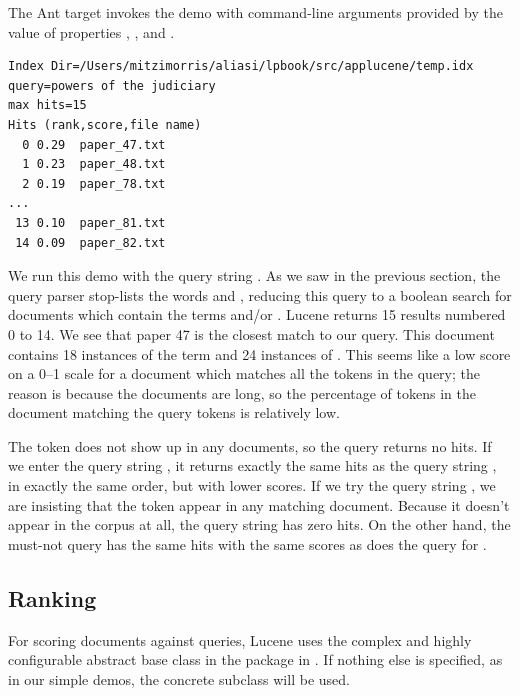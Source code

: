 The Ant target  invokes the demo with command-line
arguments provided by the value of properties ,
, and .
%
\begin{verbatim}
Index Dir=/Users/mitzimorris/aliasi/lpbook/src/applucene/temp.idx
query=powers of the judiciary
max hits=15
Hits (rank,score,file name)
  0 0.29  paper_47.txt
  1 0.23  paper_48.txt
  2 0.19  paper_78.txt
...
 13 0.10  paper_81.txt
 14 0.09  paper_82.txt
\end{verbatim}
%
We run this demo with the query string .
As we saw in the previous section, the query parser stop-lists
the words  and , reducing this
query to a boolean search for documents which contain the terms
 and/or .
Lucene returns 15 results numbered 0 to 14.  We see that paper 47 is
the closest match to our query.  This
document contains 18 instances of the term  and
24 instances of .  This seems like a low score on a 0--1 scale
for a document which matches all the tokens in the query; the reason
is because the documents are long, so the percentage of tokens in
the document matching the query tokens is relatively low.

The token  does not show up in any documents, so
the query  returns no hits.  If we enter the query string
, it returns exactly the same hits as
the query string , in exactly the same order, but with
lower scores.  If we try the query string , we are
insisting that the token  appear in any matching
document.  Because it doesn't appear in the corpus at all, the query string
 has zero hits.  On the other hand, the
must-not query  has the same hits with the
same scores as does the query for .


\subsection{Ranking}

For scoring documents against queries, Lucene uses the complex and
highly configurable abstract base class  in the
package in .  If nothing else is
specified, as in our simple demos, the concrete subclass
 will be used.

